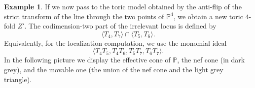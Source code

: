 \documentclass{amsart}
\theoremstyle{definition}
\newtheorem{example}[theorem]{Example}
\theoremstyle{remark}
\begin{document}
\begin{example}\label{ex-2}
If we now pass to the toric model obtained by the anti-flip of the strict
transform of the line through the two points
of $\mathbb P^4$, we obtain a new toric
$4$-fold $Z'$. The codimension-two part of the irrelevant locus is defined by
\[
\langle T_4,T_7\rangle\cap\langle T_5,T_6\rangle.
\]
Equivalently, for the localization computation, we use the monomial ideal
\[
\langle T_4T_5, T_4T_6, T_5T_7, T_6T_7 \rangle.
\]
In the following picture
we display the
effective cone of $\mathbb P$, the nef cone (in dark grey), and the movable one (the union of the
nef cone and the light grey triangle).

\begin{center}
\end{center}


\end{example}
\end{document}
